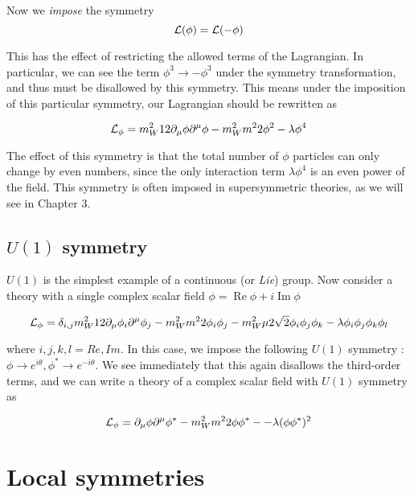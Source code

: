 Now we \textit{impose} the symmetry
\begin{equation}
\mathcal{L}(\phi) = \mathcal{L}(- \phi)
\end{equation}

This has the effect of restricting the allowed terms of the Lagrangian.
In particular, we can see the term $\phi^3 \rightarrow - \phi^3$ under the symmetry transformation, and thus must be disallowed by this symmetry.
This means under the imposition of this particular symmetry, our Lagrangian should be rewritten as

\begin{equation}
\mathcal{L}_\phi = m_W^2{1}{2} \partial_\mu \phi \partial^\mu \phi - m_W^2{m^2}{2} \phi^2  - \lambda \phi^4
\end{equation}

The effect of this symmetry is that the total number of  $\phi$ particles can only change by even numbers, since the only interaction term $\lambda \phi^4$ is an even power of the field.
This symmetry is often imposed in supersymmetric theories, as we will see in Chapter 3.

\subsection{$U(1)$ symmetry}

$U(1)$ is the simplest example of a continuous (or \textit{Lie}) group.
Now consider a theory with a single complex scalar field $\phi = \operatorname{Re}\phi + i \operatorname{Im}\phi$

\begin{equation}
\mathcal{L}_\phi = \delta_{i,j} m_W^2{1}{2} \partial_\mu \phi_i \partial^\mu \phi_j - m_W^2{m^2}{2} \phi_i \phi_j - m_W^2{\mu}{2 \sqrt{2}}  \phi_i \phi_j \phi_k  - \lambda \phi_i \phi_j \phi_k \phi_l
\end{equation}

where $i,j,k,l = Re, Im$.
In this case, we impose the following $U(1)$ symmetry : $\phi \rightarrow e^{i\theta}, \phi^* \rightarrow e^{-i\theta} $.
We see immediately that this again disallows the third-order terms, and we can write a theory of a complex scalar field with $U(1)$ symmetry as

\begin{equation}
\mathcal{L}_\phi =  \partial_\mu \phi \partial^\mu \phi^* - m_W^2{m^2}{2} \phi \phi^* -   - \lambda (\phi \phi^*)^2
\end{equation}

\section{Local symmetries}

